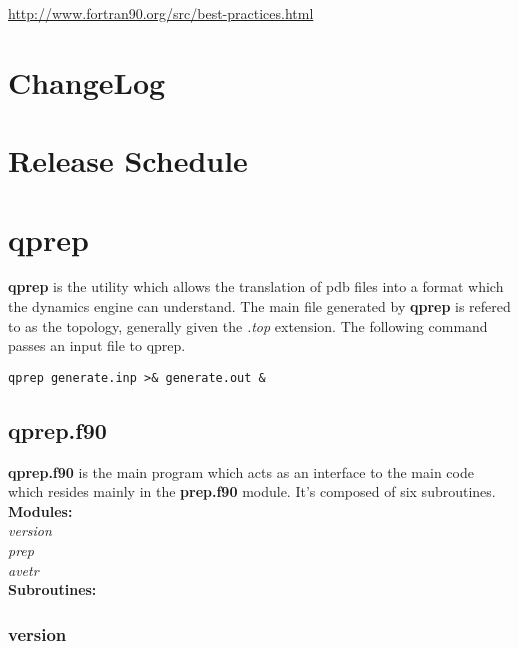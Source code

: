 \documentclass[10pt, oneside, pdftex]{article}
\begin{document}
\url{http://www.fortran90.org/src/best-practices.html}


\section{ChangeLog}
\label{changelog}


\section{Release Schedule}
\label{schedule}


\section{qprep}
\label{qprep}
\textbf{qprep}  is the  utility which  allows the  translation of  pdb
files into a format which the dynamics engine can understand. The main
file  generated  by \textbf{qprep}  is  refered  to as  the  topology,
generally  given the  \textit{.top} extension.  The following  command
passes an input file to qprep.

\lstset{language=sh, frame=single}
\begin{Verbatim}
qprep generate.inp >& generate.out &
\end{Verbatim}

\subsection{qprep.f90}

\textbf{qprep.f90} is the  main program which acts as  an interface to
the main  code which resides  mainly in the  \textbf{prep.f90} module.
It's composed of six subroutines.\\

\textbf{Modules: }\\
\textit{version}\\
\textit{prep}\\
\textit{avetr}\\


\textbf{Subroutines: }\\


\subsubsection{version} 
\end{document}
